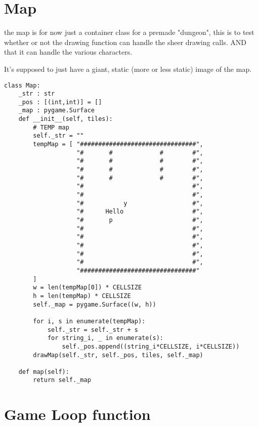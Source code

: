 \documentclass[11pt]{article}
\begin{document}
\section{Map}
\label{sec:org7cf6541}

the map is for now just a container class for a premade "dungeon", this is to test whether or not the drawing function can handle the sheer drawing calls. AND that it can handle the various characters.

It's supposed to just have a giant, static (more or less static) image of the map.

\begin{verbatim}
class Map:
    _str : str
    _pos : [(int,int)] = []
    _map : pygame.Surface
    def __init__(self, tiles):
        # TEMP map
        self._str = ""
        tempMap = [ "################################",
                    "#       #             #        #",
                    "#       #             #        #",
                    "#       #             #        #",
                    "#       #             #        #",
                    "#                              #",
                    "#                              #",
                    "#           y                  #",
                    "#      Hello                   #",
                    "#       p                      #",
                    "#                              #",
                    "#                              #",
                    "#                              #",
                    "#                              #",
                    "#                              #",
                    "################################"
        ]
        w = len(tempMap[0]) * CELLSIZE
        h = len(tempMap) * CELLSIZE
        self._map = pygame.Surface((w, h))
        
        for i, s in enumerate(tempMap):
            self._str = self._str + s
            for string_i, _ in enumerate(s):
                self._pos.append((string_i*CELLSIZE, i*CELLSIZE))
        drawMap(self._str, self._pos, tiles, self._map)

    def map(self):
        return self._map
\end{verbatim}



\section{Game Loop function}
\label{sec:org97f0b14}
\end{document}
